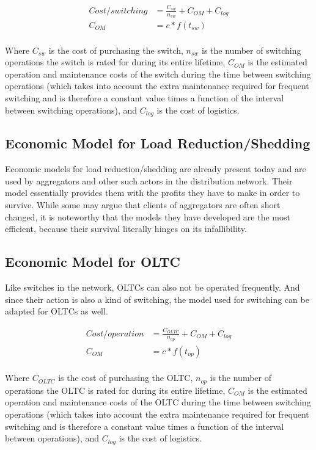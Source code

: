 \begin{align*} 
Cost/switching&=\frac{C_{sw}}{n_{sw}}+ C_{OM}+C_{log}\\
C_{OM}&=c*f(t_{sw})
\end{align*}\\

Where $C_{sw}$ is the cost of purchasing the switch, $n_{sw}$ is the number of switching operations the switch is rated for during its entire lifetime, $C_{OM}$ is the estimated operation and maintenance costs of the switch during the time between switching operations (which takes into account the extra maintenance required for frequent switching and is therefore a constant value times a function of the interval between switching operations), and $C_{log}$ is the cost of logistics.

\subsection{Economic Model for Load Reduction/Shedding}
Economic models for load reduction/shedding are already present today and are used by aggregators and other such actors in the distribution network. Their model essentially provides them with the profits they have to make in order to survive. While some may argue that clients of aggregators are often short changed, it is noteworthy that the models they have developed are the most efficient, because their survival literally hinges on its infallibility.

\subsection{Economic Model for OLTC}
Like switches in the network, OLTCs can also not be operated frequently. And since their action is also a kind of switching, the model used for switching can be adapted for OLTCs as well.

\begin{align*} 
Cost/operation&=\frac{C_{OLTC}}{n_{op}}+ C_{OM}+C_{log}\\
C_{OM}&=c*f(t_{op})
\end{align*}\\
Where $C_{OLTC}$ is the cost of purchasing the OLTC, $n_{op}$ is the number of operations the OLTC is rated for during its entire lifetime, $C_{OM}$ is the estimated operation and maintenance costs of the OLTC during the time between switching operations (which takes into account the extra maintenance required for frequent switching and is therefore a constant value times a function of the interval between operations), and $C_{log}$ is the cost of logistics.

